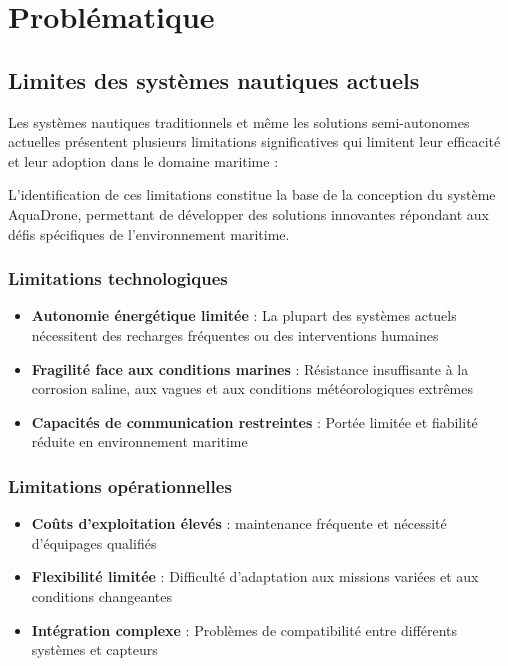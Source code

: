 \chapter[Problématique]{Problématique}
\label{cp:problematique}

{
\parindent0pt

\section{Limites des systèmes nautiques actuels}
Les systèmes nautiques traditionnels et même les solutions semi-autonomes actuelles présentent plusieurs limitations significatives qui limitent leur efficacité et leur adoption dans le domaine maritime :

\begin{block}[note]
L'identification de ces limitations constitue la base de la \gls{conception} du système AquaDrone, permettant de développer des solutions innovantes répondant aux défis spécifiques de l'environnement maritime.
\end{block}

\subsection{Limitations technologiques}
\begin{itemize}
    \setlength{\itemsep}{.375em}
    \item \textbf{Autonomie énergétique limitée} : La plupart des systèmes actuels nécessitent des recharges fréquentes ou des interventions humaines
    \item \textbf{Fragilité face aux conditions marines} : Résistance insuffisante à la corrosion saline, aux vagues et aux conditions météorologiques extrêmes
    \item \textbf{Capacités de communication restreintes} : Portée limitée et fiabilité réduite en environnement maritime
\end{itemize}

\subsection{Limitations opérationnelles}
\begin{itemize}
    \setlength{\itemsep}{.375em}
    \item \textbf{Coûts d'exploitation élevés} : \gls{maintenance} fréquente et nécessité d'équipages qualifiés
    \item \textbf{Flexibilité limitée} : Difficulté d'adaptation aux missions variées et aux conditions changeantes
    \item \textbf{Intégration complexe} : Problèmes de compatibilité entre différents systèmes et capteurs
\end{itemize}

}

